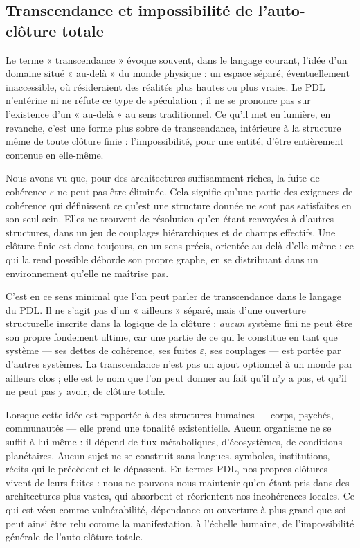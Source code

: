 \documentclass[11pt,a4paper]{article}
\theoremstyle{definition}
\begin{document}
\subsection{Transcendance et impossibilité de l'auto-clôture totale}

Le terme « transcendance » évoque souvent, dans le langage courant, l’idée d’un domaine situé « au-delà » du monde physique : un espace séparé, éventuellement inaccessible, où résideraient des réalités plus hautes ou plus vraies. Le PDL n’entérine ni ne réfute ce type de spéculation ; il ne se prononce pas sur l’existence d’un « au-delà » au sens traditionnel. Ce qu’il met en lumière, en revanche, c’est une forme plus sobre de transcendance, intérieure à la structure même de toute clôture finie : l’impossibilité, pour une entité, d’être entièrement contenue en elle-même.\cite{Laubscher_Existence_PulsatingClosure_2026,Laubscher_PDL_TO_Dialogue_2024}

Nous avons vu que, pour des architectures suffisamment riches, la fuite de cohérence \(\varepsilon\) ne peut pas être éliminée. Cela signifie qu’une partie des exigences de cohérence qui définissent ce qu’est une structure donnée ne sont pas satisfaites en son seul sein. Elles ne trouvent de résolution qu’en étant renvoyées à d’autres structures, dans un jeu de couplages hiérarchiques et de champs effectifs.\cite{Laubscher_Leakage_Probability_2024,Laubscher_UniversalCoherenceLeakage_2024} Une clôture finie est donc toujours, en un sens précis, orientée au-delà d’elle-même : ce qui la rend possible déborde son propre graphe, en se distribuant dans un environnement qu’elle ne maîtrise pas.

C’est en ce sens minimal que l’on peut parler de transcendance dans le langage du PDL. Il ne s’agit pas d’un « ailleurs » séparé, mais d’une ouverture structurelle inscrite dans la logique de la clôture : \emph{aucun} système fini ne peut être son propre fondement ultime, car une partie de ce qui le constitue en tant que système — ses dettes de cohérence, ses fuites \(\varepsilon\), ses couplages — est portée par d’autres systèmes.\cite{Laubscher_Existence_PulsatingClosure_2026} La transcendance n’est pas un ajout optionnel à un monde par ailleurs clos ; elle est le nom que l’on peut donner au fait qu’il n’y a pas, et qu’il ne peut pas y avoir, de clôture totale.

Lorsque cette idée est rapportée à des structures humaines — corps, psychés, communautés — elle prend une tonalité existentielle. Aucun organisme ne se suffit à lui-même : il dépend de flux métaboliques, d’écosystèmes, de conditions planétaires. Aucun sujet ne se construit sans langues, symboles, institutions, récits qui le précèdent et le dépassent. En termes PDL, nos propres clôtures vivent de leurs fuites : nous ne pouvons nous maintenir qu’en étant pris dans des architectures plus vastes, qui absorbent et réorientent nos incohérences locales. Ce qui est vécu comme vulnérabilité, dépendance ou ouverture à plus grand que soi peut ainsi être relu comme la manifestation, à l’échelle humaine, de l’impossibilité générale de l’auto-clôture totale.
\end{document}
